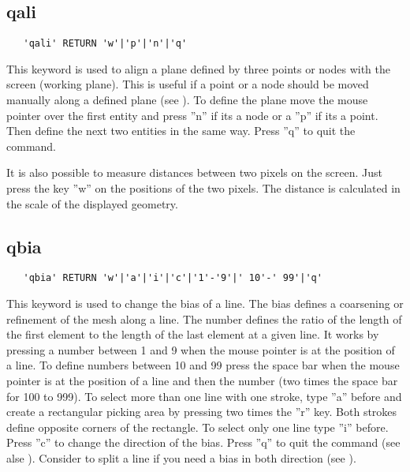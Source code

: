\documentclass{article}
\begin{document}
\subsection{\label{qali}qali}
\begin{verbatim}
   'qali' RETURN 'w'|'p'|'n'|'q' 
\end{verbatim}
This keyword is used to align a plane defined by three points or nodes with the screen (working plane). This is useful if a point or a node should be moved manually along a defined plane (see ). To define the plane move the mouse pointer over the first entity and press ''n'' if its a node or a ''p'' if its a point. Then define the next two entities in the same way. Press ''q'' to quit the command. 

It is also possible to measure distances between two pixels on the screen. Just press the key ''w'' on the positions of the two pixels. The distance is calculated in the scale of the displayed geometry.

\subsection{\label{qbia}qbia}
\begin{verbatim}
   'qbia' RETURN 'w'|'a'|'i'|'c'|'1'-'9'|' 10'-' 99'|'q' 
\end{verbatim}
This keyword is used to change the bias of a line. The bias defines a coarsening or refinement of the mesh along a line. The number defines the ratio of the length of the first element to the length of the last element at a given line. It works by pressing a number between 1 and 9 when the mouse pointer is at the position of a line. To define numbers between 10 and 99 press the space bar when the mouse pointer is at the position of a line and then the number (two times the space bar for 100 to 999). To select more than one line with one stroke, type ''a'' before and create a rectangular picking area by pressing two times the ''r'' key. Both strokes define opposite corners of the rectangle. To select only one line type ''i'' before. Press ''c'' to change the direction of the bias. Press ''q'' to quit the command (see alse ). Consider to split a line if you need a bias in both direction (see ).
\end{document}
